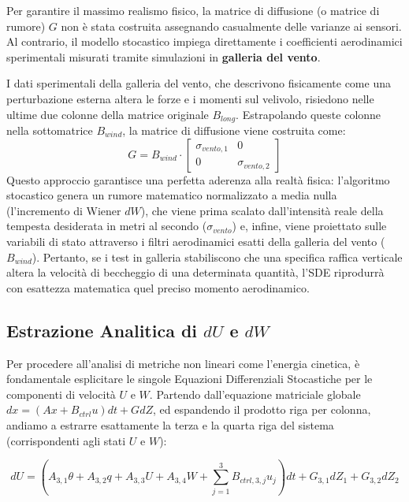 \documentclass[12pt,a4paper]{article}
\begin{document}
Per garantire il massimo realismo fisico, la matrice di diffusione (o matrice di rumore) $G$ non è stata costruita assegnando casualmente delle varianze ai sensori. Al contrario, il modello stocastico impiega direttamente i coefficienti aerodinamici sperimentali misurati tramite simulazioni in \textbf{galleria del vento}. 

I dati sperimentali della galleria del vento, che descrivono fisicamente come una perturbazione esterna altera le forze e i momenti sul velivolo, risiedono nelle ultime due colonne della matrice originale $B_{long}$. Estrapolando queste colonne nella sottomatrice $B_{wind}$, la matrice di diffusione viene costruita come:
\begin{equation}
    G = B_{wind} \cdot \begin{bmatrix} \sigma_{vento,1} & 0 \\ 0 & \sigma_{vento,2} \end{bmatrix}
\end{equation}
Questo approccio garantisce una perfetta aderenza alla realtà fisica: l'algoritmo stocastico genera un rumore matematico normalizzato a media nulla (l'incremento di Wiener $dW$), che viene prima scalato dall'intensità reale della tempesta desiderata in metri al secondo ($\sigma_{vento}$) e, infine, viene proiettato sulle variabili di stato attraverso i filtri aerodinamici esatti della galleria del vento ($B_{wind}$). Pertanto, se i test in galleria stabiliscono che una specifica raffica verticale altera la velocità di beccheggio di una determinata quantità, l'SDE riprodurrà con esattezza matematica quel preciso momento aerodinamico.

\subsection{Estrazione Analitica di $dU$ e $dW$}
Per procedere all'analisi di metriche non lineari come l'energia cinetica, è fondamentale esplicitare le singole Equazioni Differenziali Stocastiche per le componenti di velocità $U$ e $W$. Partendo dall'equazione matriciale globale $dx = (A x + B_{ctrl} u) dt + G dZ$, ed espandendo il prodotto riga per colonna, andiamo a estrarre esattamente la terza e la quarta riga del sistema (corrispondenti agli stati $U$ e $W$):

\begin{equation}
    dU = \left( A_{3,1}\theta + A_{3,2}q + A_{3,3}U + A_{3,4}W + \sum_{j=1}^{3} B_{ctrl,3,j} u_j \right) dt + G_{3,1} dZ_1 + G_{3,2} dZ_2
\end{equation}
\end{document}
